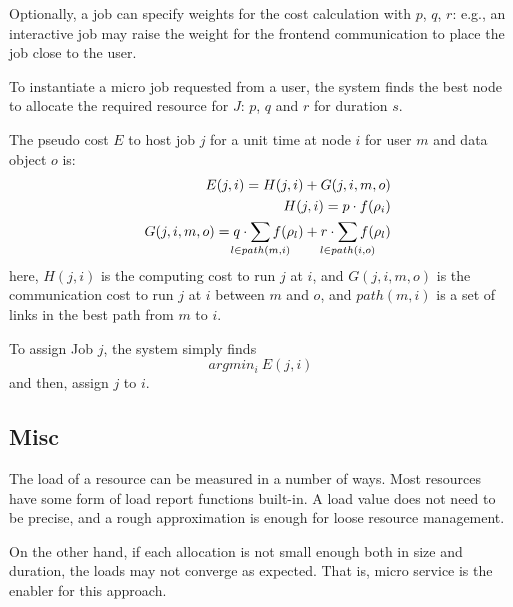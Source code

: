 Optionally, a job can specify weights for the cost calculation with
$p$, $q$, $r$: e.g., an interactive job may raise the weight for the
frontend communication to place the job close to the user.

To instantiate a micro job requested from a user, the system finds the
best node to allocate the required resource for $J$: $p$, $q$ and $r$
for duration $s$.

The pseudo cost $E$ to host job $j$ for a unit time at node $i$ for
user $m$ and data object $o$ is:
\begin{eqnarray*}
&&  E(j, i)     = H(j,i) + G(j,i,m,o) \\
&&  H(j,i)      = p \cdot f(\rho_{i}) \\
&&  G(j,i,m,o)  = q \cdot \smashoperator{\sum_{l \in path(m,i)}} f(\rho_{l}) + r \cdot \smashoperator{\sum_{l \in path(i,o)}} f(\rho_{l})
\end{eqnarray*}
here, $H(j, i)$ is the computing cost to run $j$ at $i$, and
$G(j, i, m, o)$ is the communication cost to run $j$ at $i$
between $m$ and $o$, and
$path(m,i)$ is a set of links in the best path from $m$ to $i$.

To assign Job $j$, the system simply finds
\begin{equation*}
	argmin_{i} \: E(j, i)
\end{equation*}
and then, assign $j$ to $i$.

\subsection{Misc}

The load of a resource can be measured in a number of ways.  Most
resources have some form of load report functions built-in.
A load value does not need to be precise, and a rough approximation is
enough for loose resource management.

On the other hand, if each allocation is not small enough both in size
and duration, the loads may not converge as expected.
That is, micro service is the enabler for this approach.

